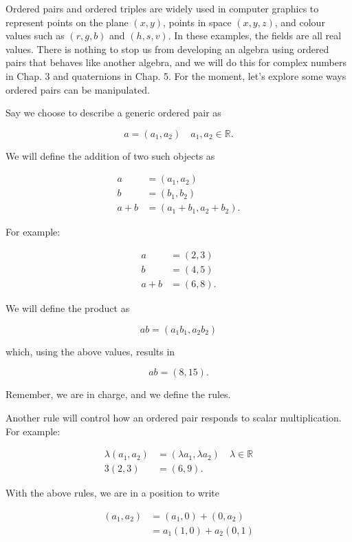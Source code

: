 Ordered pairs and ordered triples are widely used in computer graphics to represent points on the plane $(x, y)$, points in space $(x, y, z)$, and colour values such as $(r, g, b)$ and $(h, s, v)$. In these examples, the fields are all real values. There is nothing to stop us from developing an algebra using ordered pairs that behaves like another algebra, and we will do this for complex numbers in Chap. 3 and quaternions in Chap. 5. For the moment, let's explore some ways ordered pairs can be manipulated.

Say we choose to describe a generic ordered pair as

$$
a=\left(a_{1}, a_{2}\right) \quad a_{1}, a_{2} \in \mathbb{R} .
$$

We will define the addition of two such objects as

$$
\begin{aligned}
a & =\left(a_{1}, a_{2}\right) \\
b & =\left(b_{1}, b_{2}\right) \\
a+b & =\left(a_{1}+b_{1}, a_{2}+b_{2}\right) .
\end{aligned}
$$

For example:

$$
\begin{aligned}
a & =(2,3) \\
b & =(4,5) \\
a+b & =(6,8) .
\end{aligned}
$$

We will define the product as

$$
a b=\left(a_{1} b_{1}, a_{2} b_{2}\right)
$$

which, using the above values, results in

$$
a b=(8,15) .
$$

Remember, we are in charge, and we define the rules.

Another rule will control how an ordered pair responds to scalar multiplication. For example:

$$
\begin{aligned}
\lambda\left(a_{1}, a_{2}\right) & =\left(\lambda a_{1}, \lambda a_{2}\right) \quad \lambda \in \mathbb{R} \\
3(2,3) & =(6,9) .
\end{aligned}
$$

With the above rules, we are in a position to write

$$
\begin{aligned}
\left(a_{1}, a_{2}\right) & =\left(a_{1}, 0\right)+\left(0, a_{2}\right) \\
& =a_{1}(1,0)+a_{2}(0,1)
\end{aligned}
$$

